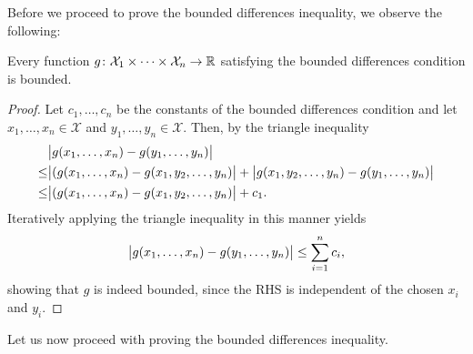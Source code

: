 Before we proceed to prove the bounded differences inequality, we observe the following:

\begin{lemma}
\label{lem: bounded differences condition}
Every function $g \colon \mathcal{X}_1 \times \dots \times \mathcal{X}_n \to \mathbb{R}$ satisfying the bounded differences condition is bounded.
\end{lemma}

\begin{proof}
Let $c_1, \dots, c_n$ be the constants of the bounded differences condition and let $x_1, \dots, x_n \in \mathcal{X}$ and $y_1, \dots, y_n \in \mathcal{X}$. Then, by the triangle inequality
\begin{align*}
    &\big\lvert g(x_1, \dots, x_n) - g(y_1, \dots, y_n) \big\rvert \\
        \leq &\big\lvert (g(x_1, \dots, x_n) - g(x_1, y_2, \dots, y_n) \big\rvert + \big\lvert g(x_1, y_2, \dots, y_n) - g(y_1, \dots, y_n) \big\rvert \\
        \leq &\big\lvert (g(x_1, \dots, x_n) - g(x_1, y_2, \dots, y_n) \big\rvert + c_1.
\end{align*}
Iteratively applying the triangle inequality in this manner yields
\[
    \big\lvert g(x_1, \dots, x_n) - g(y_1, \dots, y_n) \big\rvert \leq \sum_{i=1}^n c_i,
\]
showing that $g$ is indeed bounded, since the RHS is independent of the chosen $x_i$ and $y_i$.
\end{proof}

Let us now proceed with proving the bounded differences inequality.


